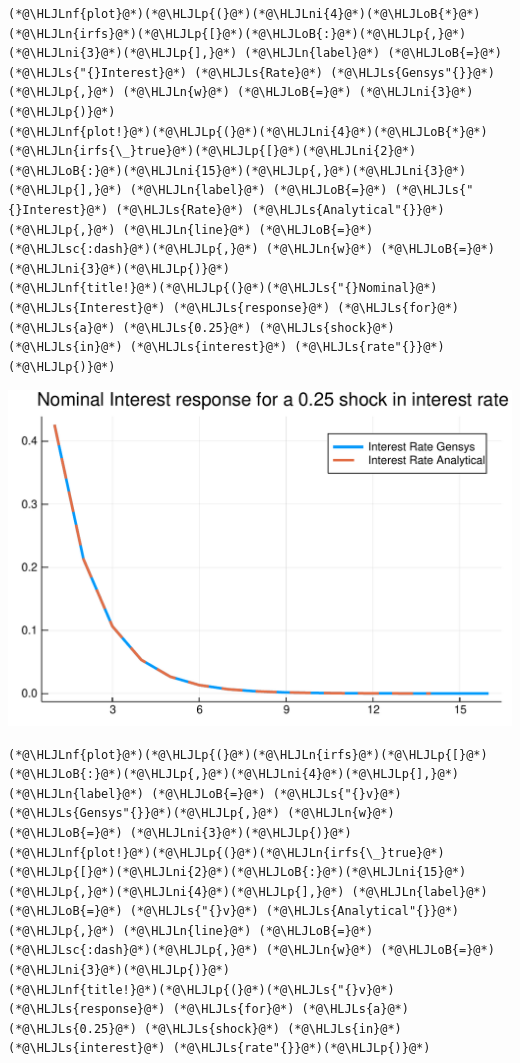 \documentclass[12pt,a4paper]{article}
\newcommand{\HLJLn}[1]{#1}
\newcommand{\HLJLnf}[1]{\textcolor[RGB]{66,102,213}{#1}}
\newcommand{\HLJLs}[1]{\textcolor[RGB]{201,61,57}{#1}}
\newcommand{\HLJLsc}[1]{\textcolor[RGB]{201,61,57}{#1}}
\newcommand{\HLJLni}[1]{\textcolor[RGB]{59,151,46}{#1}}
\newcommand{\HLJLoB}[1]{\textcolor[RGB]{102,102,102}{\textbf{#1}}}
\newcommand{\HLJLp}[1]{#1}
\begin{document}
\begin{lstlisting}
(*@\HLJLnf{plot}@*)(*@\HLJLp{(}@*)(*@\HLJLni{4}@*)(*@\HLJLoB{*}@*)(*@\HLJLn{irfs}@*)(*@\HLJLp{[}@*)(*@\HLJLoB{:}@*)(*@\HLJLp{,}@*)(*@\HLJLni{3}@*)(*@\HLJLp{],}@*) (*@\HLJLn{label}@*) (*@\HLJLoB{=}@*) (*@\HLJLs{"{}Interest}@*) (*@\HLJLs{Rate}@*) (*@\HLJLs{Gensys"{}}@*)(*@\HLJLp{,}@*) (*@\HLJLn{w}@*) (*@\HLJLoB{=}@*) (*@\HLJLni{3}@*)(*@\HLJLp{)}@*)
(*@\HLJLnf{plot!}@*)(*@\HLJLp{(}@*)(*@\HLJLni{4}@*)(*@\HLJLoB{*}@*)(*@\HLJLn{irfs{\_}true}@*)(*@\HLJLp{[}@*)(*@\HLJLni{2}@*)(*@\HLJLoB{:}@*)(*@\HLJLni{15}@*)(*@\HLJLp{,}@*)(*@\HLJLni{3}@*)(*@\HLJLp{],}@*) (*@\HLJLn{label}@*) (*@\HLJLoB{=}@*) (*@\HLJLs{"{}Interest}@*) (*@\HLJLs{Rate}@*) (*@\HLJLs{Analytical"{}}@*)(*@\HLJLp{,}@*) (*@\HLJLn{line}@*) (*@\HLJLoB{=}@*) (*@\HLJLsc{:dash}@*)(*@\HLJLp{,}@*) (*@\HLJLn{w}@*) (*@\HLJLoB{=}@*) (*@\HLJLni{3}@*)(*@\HLJLp{)}@*)
(*@\HLJLnf{title!}@*)(*@\HLJLp{(}@*)(*@\HLJLs{"{}Nominal}@*) (*@\HLJLs{Interest}@*) (*@\HLJLs{response}@*) (*@\HLJLs{for}@*) (*@\HLJLs{a}@*) (*@\HLJLs{0.25}@*) (*@\HLJLs{shock}@*) (*@\HLJLs{in}@*) (*@\HLJLs{interest}@*) (*@\HLJLs{rate"{}}@*)(*@\HLJLp{)}@*)
\end{lstlisting}

\includegraphics[width=\linewidth]{figures/dsge_and_julia_13_1.pdf}

\begin{lstlisting}
(*@\HLJLnf{plot}@*)(*@\HLJLp{(}@*)(*@\HLJLn{irfs}@*)(*@\HLJLp{[}@*)(*@\HLJLoB{:}@*)(*@\HLJLp{,}@*)(*@\HLJLni{4}@*)(*@\HLJLp{],}@*) (*@\HLJLn{label}@*) (*@\HLJLoB{=}@*) (*@\HLJLs{"{}v}@*) (*@\HLJLs{Gensys"{}}@*)(*@\HLJLp{,}@*) (*@\HLJLn{w}@*) (*@\HLJLoB{=}@*) (*@\HLJLni{3}@*)(*@\HLJLp{)}@*)
(*@\HLJLnf{plot!}@*)(*@\HLJLp{(}@*)(*@\HLJLn{irfs{\_}true}@*)(*@\HLJLp{[}@*)(*@\HLJLni{2}@*)(*@\HLJLoB{:}@*)(*@\HLJLni{15}@*)(*@\HLJLp{,}@*)(*@\HLJLni{4}@*)(*@\HLJLp{],}@*) (*@\HLJLn{label}@*) (*@\HLJLoB{=}@*) (*@\HLJLs{"{}v}@*) (*@\HLJLs{Analytical"{}}@*)(*@\HLJLp{,}@*) (*@\HLJLn{line}@*) (*@\HLJLoB{=}@*) (*@\HLJLsc{:dash}@*)(*@\HLJLp{,}@*) (*@\HLJLn{w}@*) (*@\HLJLoB{=}@*) (*@\HLJLni{3}@*)(*@\HLJLp{)}@*)
(*@\HLJLnf{title!}@*)(*@\HLJLp{(}@*)(*@\HLJLs{"{}v}@*) (*@\HLJLs{response}@*) (*@\HLJLs{for}@*) (*@\HLJLs{a}@*) (*@\HLJLs{0.25}@*) (*@\HLJLs{shock}@*) (*@\HLJLs{in}@*) (*@\HLJLs{interest}@*) (*@\HLJLs{rate"{}}@*)(*@\HLJLp{)}@*)
\end{lstlisting}
\end{document}
